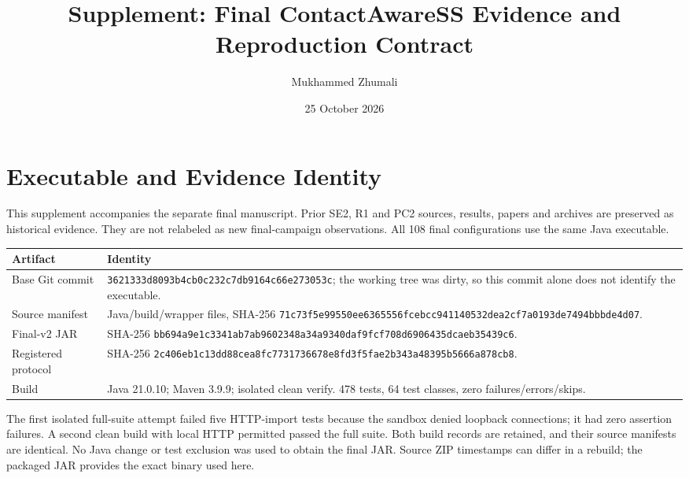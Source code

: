 \documentclass[11pt]{article}
\title{Supplement: Final ContactAwareSS Evidence and Reproduction Contract}
\author{Mukhammed Zhumali}
\date{25 October 2026}
\begin{document}
\maketitle

\section{Executable and Evidence Identity}
This supplement accompanies the separate final manuscript. Prior SE2, R1 and PC2 sources,
results, papers and archives are preserved as historical evidence. They are not relabeled as
new final-campaign observations. All 108 final configurations use the same Java executable.

\begin{longtable}{>{\raggedright\arraybackslash}p{}>{\raggedright\arraybackslash}p{}}
\toprule Artifact & Identity \\
\midrule\endhead
Base Git commit & \texttt{3621333d8093b4cb0c232}\newline\texttt{c7db9164c66e273053c}; the working tree was dirty, so this commit alone does not identify the executable. \\
Source manifest & 181 Java/build/wrapper files, SHA-256 \texttt{71c73f5e99550ee6365556fcebcc9411405}\newline\texttt{32dea2cf7a0193de7494bbbde4d07}. \\
Final-v2 JAR & SHA-256 \texttt{bb694a9e1c3341ab7ab9602348a34a934}\newline\texttt{0daf9fcf708d6906435dcaeb35439c6}. \\
Registered protocol & SHA-256 \texttt{2c406eb1c13dd88cea8fc7731736678e8}\newline\texttt{fd3f5fae2b343a48395b5666a878cb8}. \\
Build & Java 21.0.10; Maven 3.9.9; isolated clean verify. 478 tests, 64 test classes, zero failures/errors/skips. \\
\bottomrule
\end{longtable}

The first isolated full-suite attempt failed five HTTP-import tests because the sandbox denied
loopback connections; it had zero assertion failures. A second clean build with local HTTP
permitted passed the full suite. Both build records are retained, and their source manifests
are identical. No Java change or test exclusion was used to obtain the final JAR. Source ZIP
timestamps can differ in a rebuild; the packaged JAR provides the exact binary used here.
\end{document}
